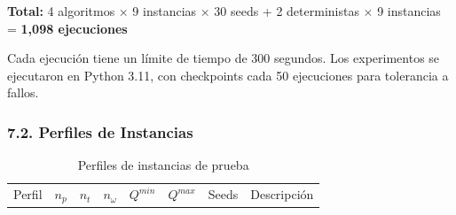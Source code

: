 \documentclass[
  spanish,
  12pt,
]{article}
\begin{document}
\textbf{Total:} 4 algoritmos × 9 instancias × 30 seeds + 2 deterministas
× 9 instancias = \textbf{1,098 ejecuciones}

Cada ejecución tiene un límite de tiempo de 300 segundos. Los
experimentos se ejecutaron en Python 3.11, con checkpoints cada 50
ejecuciones para tolerancia a fallos.

\subsubsection{7.2. Perfiles de
Instancias}\label{perfiles-de-instancias}

\begin{longtable}[]{@{}
  >{\raggedright\arraybackslash}p{}
  >{\centering\arraybackslash}p{}
  >{\centering\arraybackslash}p{}
  >{\centering\arraybackslash}p{}
  >{\centering\arraybackslash}p{}
  >{\centering\arraybackslash}p{}
  >{\centering\arraybackslash}p{}
  >{\raggedright\arraybackslash}p{}@{}}
\caption{\label{tbl:tabla_6}Perfiles de instancias de
prueba}\tabularnewline
\toprule\noalign{}
\begin{minipage}[b]{\linewidth}\raggedright
Perfil
\end{minipage} & \begin{minipage}[b]{\linewidth}\centering
\(n_p\)
\end{minipage} & \begin{minipage}[b]{\linewidth}\centering
\(n_t\)
\end{minipage} & \begin{minipage}[b]{\linewidth}\centering
\(n_\omega\)
\end{minipage} & \begin{minipage}[b]{\linewidth}\centering
\(Q^{min}\)
\end{minipage} & \begin{minipage}[b]{\linewidth}\centering
\(Q^{max}\)
\end{minipage} & \begin{minipage}[b]{\linewidth}\centering
Seeds
\end{minipage} & \begin{minipage}[b]{\linewidth}\raggedright
Descripción
\end{minipage} \\

\end{longtable}
\end{document}
